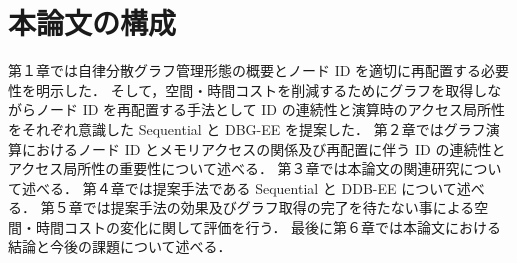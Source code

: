 \section{本論文の構成}
第１章では自律分散グラフ管理形態の概要とノード ID を適切に再配置する必要性を明示した．
そして，空間・時間コストを削減するためにグラフを取得しながらノード ID を再配置する手法として ID の連続性と演算時のアクセス局所性をそれぞれ意識した Sequential と DBG-EE を提案した．
第２章ではグラフ演算におけるノード ID とメモリアクセスの関係及び再配置に伴う ID の連続性とアクセス局所性の重要性について述べる．
第３章では本論文の関連研究について述べる．
第４章では提案手法である Sequential と DDB-EE について述べる．
第５章では提案手法の効果及びグラフ取得の完了を待たない事による空間・時間コストの変化に関して評価を行う．
最後に第６章では本論文における結論と今後の課題について述べる．